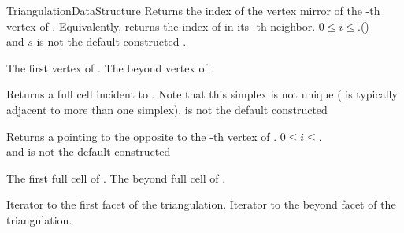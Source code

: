 \begin{ccRefConcept}{TriangulationDataStructure}
{Returns the index of the vertex mirror of the -th vertex of .
Equivalently, returns the index of  in its -th neighbor.
\ccPrecond $0\leq i\leq$\ccVar.()\\
and $s$ is not the default constructed . }

{}
{
The first vertex of \ccVar.
}
\ccGlue
{}
{
The beyond vertex of \ccVar.
}


{Returns a full cell incident to  . Note that this simplex is
not unique ( is typically adjacent to more than one simplex).
\ccPrecond{} is not the default constructed }

{ Returns a  pointing to the 
opposite to the -th vertex of . 
\ccPrecond$0\leq i \leq$\ccVar.\\
and  is not the default constructed }

{}
{
The first full cell of \ccVar.
}
\ccGlue
{}
{
The beyond full cell of \ccVar.
}


{Iterator to the first facet of the triangulation.}
\ccGlue
{}
{Iterator to the beyond facet of the triangulation.}


\end{ccRefConcept}
